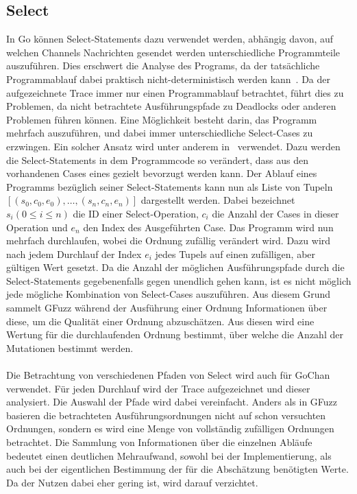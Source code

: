 \subsection{Select}\label{Chap:Back-Sec:Select}
In Go können Select-Statements dazu verwendet werden, abhängig davon, 
auf welchen Channels Nachrichten gesendet werden unterschiedliche Programmteile
auszuführen. Dies erschwert die Analyse des Programs, da der 
tatsächliche Programmablauf dabei praktisch nicht-deterministisch werden 
kann~\cite{select-spec}. Da der aufgezeichnete Trace immer nur einen 
Programmablauf betrachtet, führt dies zu Problemen, da 
nicht betrachtete Ausführungspfade zu Deadlocks oder anderen Problemen 
führen können. Eine Möglichkeit besteht darin, das Programm mehrfach auszuführen, 
und dabei immer unterschiedliche Select-Cases zu erzwingen. Ein solcher 
Ansatz wird unter anderem in~\cite{gfuzz} verwendet. Dazu werden die 
Select-Statements in dem Programmcode so verändert, dass aus den vorhandenen 
Cases eines gezielt bevorzugt werden kann.
Der Ablauf eines Programms bezüglich seiner 
Select-Statements kann nun als Liste von Tupeln 
$[(s_0, c_0, e_0), \ldots, (s_n, c_n, e_n)]$ dargestellt werden. Dabei 
bezeichnet $s_i (0 \leq i \leq n)$ die ID einer Select-Operation, $c_i$ 
die Anzahl der Cases in dieser Operation und $e_n$ den Index des Ausgeführten 
Case. Das Programm wird nun mehrfach durchlaufen, wobei die Ordnung zufällig 
verändert wird. Dazu wird nach jedem Durchlauf der Index $e_i$ jedes Tupels 
auf einen zufälligen, aber gültigen Wert gesetzt. Da die Anzahl der möglichen 
Ausführungspfade durch die Select-Statements gegebenenfalls gegen unendlich gehen kann,
ist es nicht möglich jede mögliche Kombination von Select-Cases auszuführen.
Aus diesem Grund sammelt GFuzz während der Ausführung einer Ordnung Informationen 
über diese, um die Qualität einer Ordnung abzuschätzen. Aus diesen wird 
eine Wertung für die durchlaufenden Ordnung bestimmt, über welche die 
Anzahl der Mutationen bestimmt werden. \\\\
Die Betrachtung von verschiedenen Pfaden von Select wird auch für GoChan 
verwendet. Für jeden Durchlauf wird 
der Trace aufgezeichnet und dieser
analysiert. Die Auswahl der Pfade wird dabei vereinfacht. Anders als 
in GFuzz basieren die betrachteten Ausführungsordnungen nicht auf schon versuchten Ordnungen,
sondern es wird eine Menge von vollständig zufälligen Ordnungen betrachtet.
Die Sammlung von Informationen über die einzelnen Abläufe bedeutet einen 
deutlichen Mehraufwand, sowohl bei der Implementierung, als auch bei der eigentlichen 
Bestimmung der für die Abschätzung benötigten Werte. Da der Nutzen dabei eher gering ist,
wird darauf verzichtet.
